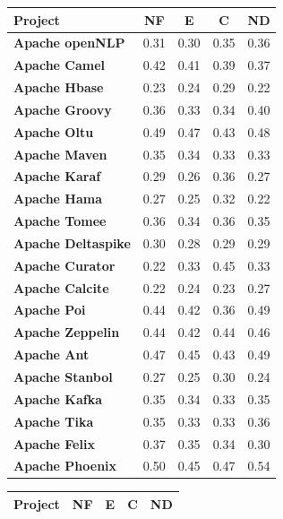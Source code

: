 {\begin{landscape}
\begin{table}[!htbp]
	
	\begin{tabular}{l|c|c|c|c}
		\hline
		\textbf{Project}   & {\bf NF}    & {\bf E} & {\bf C} & {\bf ND}    \\ \hline
\textbf{Apache openNLP} & 0.31 & 0.30 & 0.35 & 0.36\\ \hline
\textbf{Apache Camel} & 0.42 & 0.41 & 0.39 & 0.37\\ \hline
\textbf{Apache Hbase} & 0.23 & 0.24 & 0.29 & 0.22\\ \hline
\textbf{Apache Groovy} & 0.36 & 0.33 & 0.34 & 0.40\\ \hline
\textbf{Apache Oltu} & 0.49 & 0.47 & 0.43 & 0.48\\ \hline
\textbf{Apache Maven} & 0.35 & 0.34 & 0.33 & 0.33\\ \hline
\textbf{Apache Karaf} & 0.29 & 0.26 & 0.36 & 0.27\\ \hline
\textbf{Apache Hama} & 0.27 & 0.25 & 0.32 & 0.22\\ \hline
\textbf{Apache Tomee} & 0.36 & 0.34 & 0.36 & 0.35\\ \hline
\textbf{Apache Deltaspike} & 0.30 & 0.28 & 0.29 & 0.29\\ \hline
\textbf{Apache Curator} & 0.22 & 0.33 & 0.45 & 0.33\\ \hline
\textbf{Apache Calcite} & 0.22 & 0.24 & 0.23 & 0.27\\ \hline
\textbf{Apache Poi} & 0.44 & 0.42 & 0.36 & 0.49\\ \hline
\textbf{Apache Zeppelin} & 0.44 & 0.42 & 0.44 & 0.46\\ \hline
\textbf{Apache Ant} & 0.47 & 0.45 & 0.43 & 0.49\\ \hline
\textbf{Apache Stanbol} & 0.27 & 0.25 & 0.30 & 0.24\\ \hline
\textbf{Apache Kafka} & 0.35 & 0.34 & 0.33 & 0.35\\ \hline
\textbf{Apache Tika} & 0.35 & 0.33 & 0.33 & 0.36\\ \hline
\textbf{Apache Felix} & 0.37 & 0.35 & 0.34 & 0.30\\ \hline
\textbf{Apache Phoenix} & 0.50 & 0.45 & 0.47 & 0.54\\ \hline
\end{tabular}
\quad \quad \quad 
	\begin{tabular}{l|c|c|c|c}
	\hline
	\textbf{Project}   & {\bf NF}    & {\bf E} & {\bf C} & {\bf ND}    \\ \hline


\end{tabular}
\end{table}
\end{landscape}}
